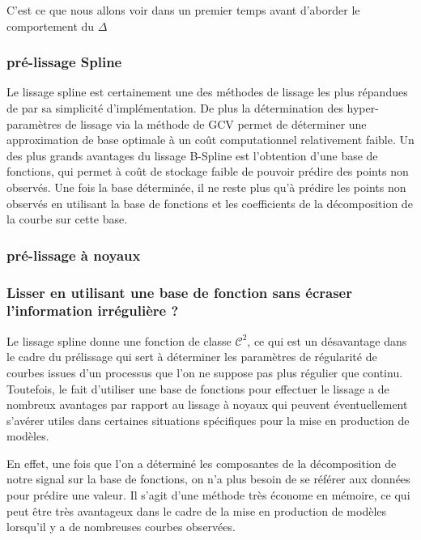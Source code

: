
C'est ce que nous allons voir dans un premier temps avant d'aborder le comportement du $\Delta$

\subsubsection{pré-lissage Spline}

Le lissage spline est certainement une des méthodes de lissage les plus répandues de par sa simplicité d'implémentation. De plus la détermination des hyper-paramètres de lissage via la méthode de GCV permet de déterminer une approximation de base optimale à un coût computationnel relativement faible. Un des plus grands avantages du lissage B-Spline est l'obtention d'une base de fonctions, qui permet à coût de stockage faible de pouvoir prédire des points non observés. Une fois la base déterminée, il ne reste plus qu'à prédire les points non observés en utilisant la base de fonctions et les coefficients de la décomposition de la courbe sur cette base.



\subsubsection{pré-lissage à noyaux}





\subsubsection{Lisser en utilisant une base de fonction sans écraser l'information irrégulière ?}

Le lissage spline donne une fonction de classe $\mathcal C^2$, ce qui est un désavantage dans le cadre du prélissage qui sert à déterminer les paramètres de régularité de courbes issues d'un processus que l'on ne suppose pas plus régulier que continu. Toutefois, le fait d'utiliser une base de fonctions pour effectuer le lissage a de nombreux avantages par rapport au lissage à noyaux qui peuvent éventuellement s'avérer utiles dans certaines situations spécifiques pour la mise en production de modèles.

En effet, une fois que l'on a déterminé les composantes de la décomposition de notre signal sur la base de fonctions, on n'a plus besoin de se référer aux données pour prédire une valeur. Il s'agit d'une méthode très économe en mémoire, ce qui peut être très avantageux dans le cadre de la mise en production de modèles lorsqu'il y a de nombreuses courbes observées.


